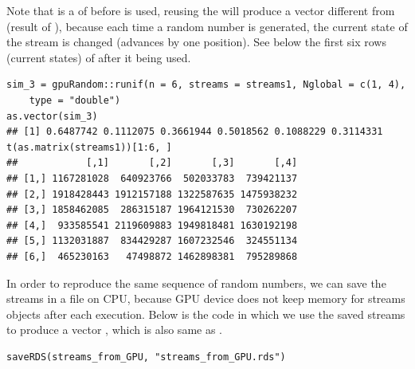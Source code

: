 \documentclass[article,nojss]{jss}\usepackage[]{graphicx}\usepackage[]{color}
\makeatletter
\newenvironment{kframe}{%
 \def\at@end@of@kframe{}%
 \ifinner\ifhmode%
  \def\at@end@of@kframe{\end{minipage}}%
  \begin{minipage}{\columnwidth}%
 \fi\fi%
 \def\FrameCommand##1{\hskip\@totalleftmargin \hskip-\fboxsep
 \colorbox{shadecolor}{##1}\hskip-\fboxsep
     \hskip-\linewidth \hskip-\@totalleftmargin \hskip\columnwidth}%
 \MakeFramed {\advance\hsize-\width
   \@totalleftmargin\z@ \linewidth\hsize
   \@setminipage}}%
 {\par\unskip\endMakeFramed%
 \at@end@of@kframe}
\newenvironment{knitrout}{}{} %
\makeatother
\begin{document}
Note that  is a  of  before  is used, reusing the  will produce a vector  different from  (result of ), because each time a random number is generated, the current state of the stream is changed (advances by one position). See below the first six rows (current states) of  after it being used.
\begin{knitrout}
\color{fgcolor}\begin{kframe}
\begin{verbatim}
sim_3 = gpuRandom::runif(n = 6, streams = streams1, Nglobal = c(1, 4),
    type = "double")
as.vector(sim_3)
## [1] 0.6487742 0.1112075 0.3661944 0.5018562 0.1088229 0.3114331
t(as.matrix(streams1))[1:6, ]
##            [,1]       [,2]       [,3]       [,4]
## [1,] 1167281028  640923766  502033783  739421137
## [2,] 1918428443 1912157188 1322587635 1475938232
## [3,] 1858462085  286315187 1964121530  730262207
## [4,]  933585541 2119609883 1949818481 1630192198
## [5,] 1132031887  834429287 1607232546  324551134
## [6,]  465230163   47498872 1462898381  795289868
\end{verbatim}
\end{kframe}
\end{knitrout}
In order to reproduce the same sequence of random numbers, we can save the streams in a file on CPU, because GPU device does not keep memory for streams objects after each execution. Below is the  code in which we use the saved streams  to produce a vector , which is also same as .
\begin{knitrout}
\color{fgcolor}\begin{kframe}
\begin{verbatim}
saveRDS(streams_from_GPU, "streams_from_GPU.rds")
\end{verbatim}
\end{kframe}
\end{knitrout}
\end{document}

